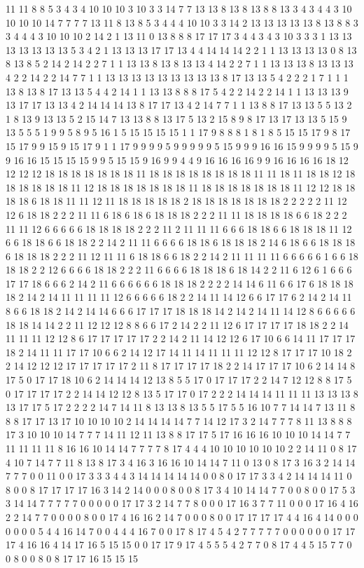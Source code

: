 11 11 8 8 5 3 4 3 4 10 10 10 3 10 3 3 14 7 7 13 13 8 13 8 13 8 8 13 3 4 3 4 4 3 10 10 10 10 14 7 7 7 7 13 11 8 13 8 5 3 4 4 4 10 10 3 3 14 2 13 13 13 13 13 8 13 8 8 3 3 4 4 4 3 10 10 10 2 14 2 1 13 11 0 13 8 8 8 17 17 17 3 4 4 3 4 3 10 3 3 3 1 13 13 13 13 13 13 13 5 3 4 2 1 13 13 13 17 17 13 4 4 14 14 14 2 2 1 1 13 13 13 13 0 8 13 8 13 8 5 2 14 2 14 2 2 7 1 1 13 13 8 13 8 13 13 4 14 2 2 7 1 1 13 13 13 8 13 13 13 4 2 2 14 2 2 14 7 7 1 1 13 13 13 13 13 13 13 13 13 8 17 13 13 5 4 2 2 2 1 7 1 1 1 13 8 13 8 17 13 13 5 4 4 2 14 1 1 13 13 8 8 8 17 5 4 2 2 14 2 2 14 1 1 13 13 13 9 13 17 17 13 13 4 2 14 14 14 13 8 17 17 13 4 2 14 7 7 1 1 13 8 8 17 13 13 5 5 13 2 1 8 13 9 13 13 5 2 15 14 7 13 13 8 8 13 17 5 13 2 15 8 9 8 17 13 17 13 13 5 15 9 13 5 5 5 1 9 9 5 8 9 5 16 1 5 15 15 15 15 1 1 17 9 8 8 8 1 8 1 8 5 15 15 17 9 8 17 15 17 9 9 15 9 15 17 9 1 1 17 9 9 9 9 5 9 9 9 9 9 5 15 9 9 9 16 16 15 9 9 9 9 5 15 9 9 16 16 15 15 15 15 9 9 5 15 15 9 16 9 9 4 4 9 16 16 16 16 9 9 16 16 16 16 18 12 12 12 12 18 18 18 18 18 18 18 11 18 18 18 18 18 18 18 18 11 11 18 11 18 18 12 18 18 18 18 18 18 11 12 18 18 18 18 18 18 18 11 18 18 18 18 18 18 18 11 12 12 18 18 18 18 6 18 18 11 11 12 11 18 18 18 18 18 2 18 18 18 18 18 18 18 2 2 2 2 2 11 12 12 6 18 18 2 2 2 11 11 6 18 6 18 6 18 18 18 2 2 2 11 11 18 18 18 18 6 6 18 2 2 2 11 11 12 6 6 6 6 6 18 18 18 18 2 2 2 11 2 11 11 11 6 6 6 18 18 6 6 18 18 18 11 12 6 6 18 18 6 6 18 18 2 2 14 2 11 11 6 6 6 6 18 18 6 18 18 18 2 14 6 18 6 6 18 18 18 6 18 18 18 2 2 2 11 12 11 11 6 18 18 6 6 18 2 2 14 2 11 11 11 11 6 6 6 6 6 1 6 6 18 18 18 2 2 12 6 6 6 6 18 18 2 2 2 11 6 6 6 6 18 18 18 6 18 14 2 2 11 6 12 6 1 6 6 6 17 17 18 6 6 6 2 14 2 11 6 6 6 6 6 6 18 18 18 2 2 2 2 14 14 6 11 6 6 17 6 18 18 18 18 2 14 2 14 11 11 11 11 12 6 6 6 6 6 18 2 2 14 11 14 12 6 6 17 17 6 2 14 2 14 11 8 6 6 18 18 2 14 2 14 14 6 6 6 17 17 17 18 18 18 14 2 14 2 14 11 14 12 8 6 6 6 6 6 18 18 14 14 2 2 11 12 12 12 8 8 6 6 17 2 14 2 2 11 12 6 17 17 17 17 18 18 2 2 14 11 11 11 12 12 8 6 17 17 17 17 17 2 2 14 2 11 14 12 12 6 17 10 6 6 14 11 17 17 17 18 2 14 11 11 17 17 10 6 6 2 14 12 17 14 11 14 11 11 11 12 12 8 17 17 17 10 18 2 2 14 12 12 12 17 17 17 17 17 2 11 8 17 17 17 17 18 2 2 14 17 17 17 10 6 2 14 14 8 17 5 0 17 17 18 10 6 2 14 14 14 12 13 8 5 5 17 0 17 17 17 2 2 14 7 12 12 8 8 17 5 0 17 17 17 17 2 2 14 14 12 12 8 13 5 17 17 0 17 2 2 2 14 14 14 11 11 11 13 13 13 8 13 17 17 5 17 2 2 2 2 14 7 14 11 8 13 13 8 13 5 5 17 5 5 16 10 7 7 14 14 7 13 11 8 8 8 17 17 13 17 10 10 10 10 2 14 14 14 14 7 7 14 12 17 3 2 14 7 7 7 8 11 13 8 8 8 17 3 10 10 10 14 7 7 7 14 11 12 11 13 8 8 17 17 5 17 16 16 16 10 10 10 14 14 7 7 11 11 11 11 8 16 16 10 14 14 7 7 7 7 8 17 4 4 4 10 10 10 10 10 10 2 2 14 11 0 8 17 4 10 7 14 7 7 11 8 13 8 17 3 4 16 3 16 16 10 14 14 7 11 0 13 0 8 17 3 16 3 2 14 14 7 7 7 0 0 11 0 0 17 3 3 3 4 4 3 14 14 14 14 14 0 0 8 0 17 17 3 3 4 2 14 14 14 11 0 8 0 0 8 17 17 17 17 16 3 14 2 14 0 0 0 8 0 0 8 17 3 4 10 14 14 7 7 0 0 8 0 0 17 5 3 3 14 14 7 7 7 7 7 0 0 0 0 0 17 17 3 2 14 7 7 8 0 0 0 17 16 3 7 7 11 0 0 0 17 16 4 16 2 2 14 7 7 0 0 0 0 8 0 0 17 4 16 16 2 14 7 0 0 0 8 0 0 17 17 17 17 4 4 16 4 14 0 0 0 0 0 0 0 5 4 4 16 14 7 0 0 4 4 4 16 7 0 0 17 8 17 4 5 4 2 7 7 7 7 7 0 0 0 0 0 0 17 17 17 4 16 16 4 14 17 16 5 15 15 0 0 17 17 9 17 4 5 5 5 4 2 7 7 0 8 17 4 4 5 15 7 7 0 0 8 0 0 8 0 8 17 17 16 15 15 15 